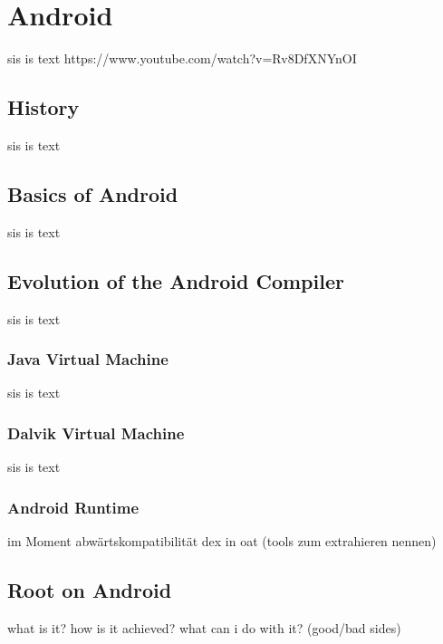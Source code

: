 \section{Android}\label{section:android}
sis is text\newline
https://www.youtube.com/watch?v=Rv8DfXNYnOI
\subsection{History}\label{subsection:android-history}
sis is text
\subsection{Basics of Android}\label{subsection:android-basics}
sis is text
\subsection{Evolution of the Android Compiler}\label{subsection:android-evolution}
sis is text
\subsubsection{Java Virtual Machine}\label{subsubsection:android-evolution-jvm}
sis is text
\subsubsection{Dalvik Virtual Machine}\label{subsubsection:android-evolution-dvm}
sis is text
\subsubsection{Android Runtime}\label{subsubsection:android-evolution-art}
im Moment abwärtskompatibilität dex in oat (tools zum extrahieren nennen)
\subsection{Root on Android}\label{subsection:android-root}
what is it? how is it achieved? what can i do with it? (good/bad sides)
